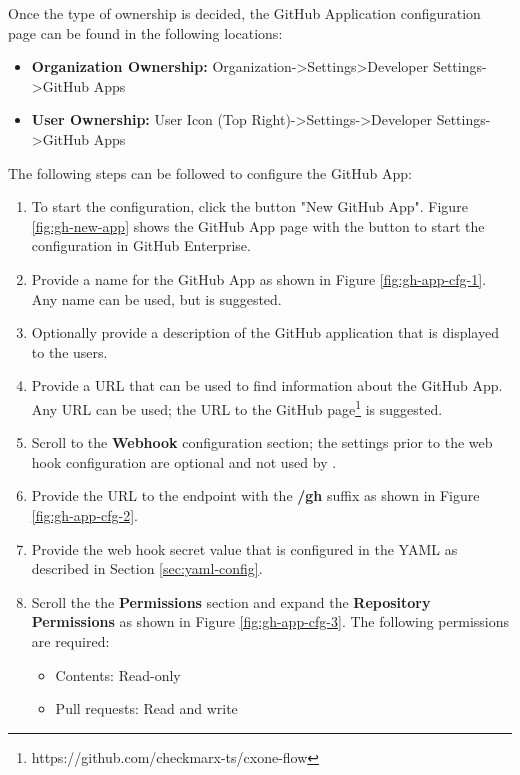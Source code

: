 Once the type of ownership is decided, the GitHub Application configuration page can be found in the following
locations:

\begin{itemize}
    \item \textbf{Organization Ownership:} Organization->Settings>Developer Settings->GitHub Apps
    \item \textbf{User Ownership:} User Icon (Top Right)->Settings->Developer Settings->GitHub Apps
\end{itemize}

The following steps can be followed to configure the \cxoneflow GitHub App:

\begin{enumerate}
    \item To start the configuration, click the button "New GitHub App". Figure \ref{fig:gh-new-app} shows
    the GitHub App page with the button to start the configuration in GitHub Enterprise.
    \item Provide a name for the GitHub App as shown in Figure \ref{fig:gh-app-cfg-1}.  Any name
    can be used, but \cxoneflow is suggested.
    \item Optionally provide a description of the GitHub application that is displayed to the users.
    \item Provide a URL that can be used to find information about the \cxoneflow GitHub App.  Any URL
    can be used; the URL to the \cxoneflow GitHub page\footnote{https://github.com/checkmarx-ts/cxone-flow}
    is suggested.
    \item Scroll to the \textbf{Webhook} configuration section; the settings prior to the web hook configuration
    are optional and not used by \cxoneflow.
    \item Provide the URL to the \cxoneflow endpoint with the \textbf{/gh} suffix as shown in Figure \ref{fig:gh-app-cfg-2}.
    \item Provide the web hook secret value that is configured in the \cxoneflow YAML as described in Section \ref{sec:yaml-config}.
    \item Scroll the the \textbf{Permissions} section and expand the \textbf{Repository Permissions} as shown in
    Figure \ref{fig:gh-app-cfg-3}.  The following permissions are required:
    \begin{itemize}
        \item Contents: Read-only
        \item Pull requests: Read and write
    \end{itemize}

\end{enumerate}
